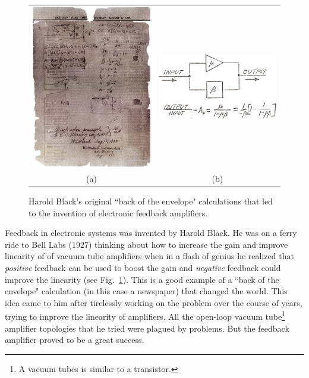 \begin{figure}[tb]
\begin{center}
\begin{tabular}{cc}
\includegraphics[width=.6\columnwidth]{image_1.jpg} &
\includegraphics[width=.4\columnwidth]{image_2.png} \\
(a) & (b) \\
\end{tabular}
\end{center}
\caption{Harold Black's original ``back of the envelope" calculations that led to the invention of electronic feedback amplifiers.} \label{fig:image_1.jpg}
\end{figure}

Feedback in electronic systems was invented by Harold Black.  He was on a ferry ride to Bell Labs (1927) thinking about how to increase the gain and improve linearity of of vacuum tube amplifiers when in a flash of genius he realized that \textit{positive} feedback can be used to boost the gain and \textit{negative} feedback could improve the linearity (see Fig.~\ref{fig:image_1.jpg}).  This is a good example of a ``back of the envelope" calculation (in this case a newspaper) that changed the world.  This idea came to him after tirelessly working on the problem over the course of years, trying to improve the linearity of amplifiers.  All the open-loop vacuum tube\footnote{A vacuum tubes is similar to a transistor.} amplifier topologies that he tried were plagued by problems.  But the feedback amplifier proved to be a great success.
 


